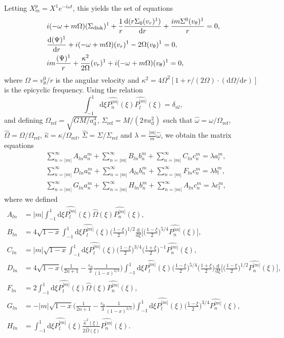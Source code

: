 \documentclass[11pt]{article}
\newcommand{\rd}{\mathrm{d}}
\newcommand{\vr}{v_{r}}
\newcommand{\vt}{v_{\theta}}
\newcommand{\Sigmad}{\Sigma_{\rm{disk}}}
\newcommand{\ad}{a_{\mathrm{d}}}
\newcommand{\anm}{a_n^m}
\newcommand{\bnm}{b_n^m}
\newcommand{\cnm}{c_n^m}
\newcommand{\alm}{a_l^m}
\newcommand{\blm}{b_l^m}
\newcommand{\clm}{c_l^m}
\newcommand{\Pnm}{P_n^{|m|}}
\newcommand{\Plm}{P_l^{|m|}}
\newcommand{\hPnm}{\widehat{\Pnm}}
\newcommand{\hPlm}{\widehat{\Plm}}
\newcommand{\homega}{\widehat{\omega}}
\newcommand{\hOmega}{\widehat{\Omega}}
\newcommand{\Omegaref}{\Omega_{\mathrm{ref}}}
\newcommand{\hkappa}{\widehat{\kappa}}
\newcommand{\Sigmaref}{\Sigma_{\mathrm{ref}}}
\newcommand{\hSigma}{\widehat{\Sigma}}
\begin{document}
Letting $X_m^p = X^1  e^{-i \omega t}$, this yields the set of equations
\begin{align}
&i(-\omega + m \Omega)(\Sigmad)^1 + \frac{1}{r} \frac{\rd (r\Sigma_0 (\vr)^1)}{\rd r} + \frac{im\Sigma^0 (\vt)^1}{r} = 0,\\
&\frac{\rd (\Psi)^1}{\rd r} + i(-\omega + m \Omega)(\vr)^1 - 2 \Omega (\vt)^1 = 0,\\
&i m \frac{(\Psi)^1}{r} + \frac{\kappa^2}{2\Omega} (\vr)^1 + i(-\omega + m \Omega)(\vt)^1 = 0,
\end{align}
where $\Omega = \vt^0/r$ is the angular velocity and $\kappa^2=4\Omega^2[1+r/(2\Omega)\cdot(\rd \Omega /\rd r)]$ is the epicyclic frequency. Using the relation 
$$\int_{-1}^{1} \rd \xi \hPnm(\xi)\hPlm(\xi) = \delta_{nl},$$
and defining $\Omegaref=\sqrt{GM/\ad^3 }$, $\Sigmaref=M/(2\pi \ad^2)$   such that $\homega = \omega/\Omegaref$, $\hOmega = \Omega/\Omegaref$, $\hkappa = \kappa/\Omegaref$, $\hSigma=\Sigma/\Sigmaref$ and $\lambda=\frac{|m|}{m}\homega$, we obtain the matrix equations
\begin{align}
&\sum_{n=|m|}^{\infty}  A_{ln} \anm  +\sum_{n=|m|}^{\infty}  B_{ln}\bnm+\sum_{n=|m|}^{\infty}  C_{ln}\cnm= \lambda \alm ,\\
&\sum_{n=|m|}^{\infty}D_{ln}\anm + \sum_{n=|m|}^{\infty}   A_{ln} \bnm+  \sum_{n=|m|}^{\infty} F_{ln} \cnm  =  \lambda    \blm ,\\
&\sum_{n=|m|}^{\infty}G_{ln}\anm + \sum_{n=|m|}^{\infty}   H_{ln} \bnm+  \sum_{n=|m|}^{\infty} A_{ln} \cnm  =  \lambda    \clm ,
 \end{align}
where we defined
\begin{align}
A_{ln} &= |m| \int_{-1}^{1} \rd \xi  \hPlm(\xi)\hOmega(\xi)\hPnm(\xi) , \\
B_{ln} &= 4 {\sqrt{1-x}} \int_{-1}^{1} \rd \xi  \hPlm(\xi) \bigg(\frac{1-\xi}{2}\bigg)^{1/2} \frac{\rd}{\rd \xi} \bigg[\bigg(\frac{1-\xi}{2}\bigg)^{5/4}\hPnm(\xi)\bigg], \\
C_{ln} &= |m| {\sqrt{1-x}}\int_{-1}^{1} \rd \xi \hPlm(\xi) \bigg(\frac{1-\xi}{2}\bigg)^{3/4}\bigg(\frac{1+\xi}{2}\bigg)^{-1}   \hPnm(\xi), \\
D_{ln} &= 4{\sqrt{1-x}} \bigg(\frac{1}{2n+1}-\frac{\varepsilon_0}{3}  \frac{1}{(1-x)^{2/3}} \bigg) \int_{-1}^{1} \rd \xi \hPlm(\xi)  \bigg(\frac{1-\xi}{2}\bigg)^{5/4} \bigg(\frac{1+\xi}{2}\bigg) 
\frac{\rd}{\rd \xi} \bigg[ \bigg(\frac{1-\xi}{2}\bigg)^{1/2}\hPnm(\xi) \bigg] ,\\
F_{ln} &=2 \int_{-1}^{1} \rd \xi  \hPlm(\xi)\hOmega(\xi)\hPnm(\xi) , \\
G_{ln} &= -|m|{\sqrt{1-x}} \bigg(\frac{1}{2n+1}-\frac{\varepsilon_0}{3}  \frac{1}{(1-x)^{2/3}}  \bigg)  \int_{-1}^{1} \rd \xi \hPlm(\xi)  \bigg(\frac{1-\xi}{2}\bigg)^{3/4} 
\hPnm(\xi)  ,\\
H_{ln} &= \int_{-1}^{1} \rd \xi  \hPlm(\xi)\frac{\hkappa^2(\xi)}{2\hOmega(\xi)}\hPnm(\xi) .
\end{align}
\end{document}
